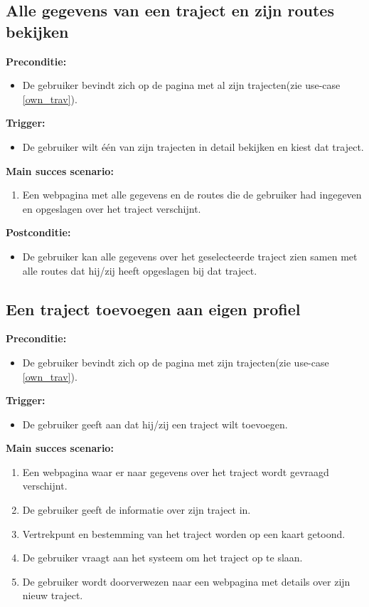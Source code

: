 \documentclass[11pt,twoside,a4paper]{article}
\newcommand{\subpunt}[1]{
	\noindent
	\textbf{\small{#1}}
}
\newenvironment{precond}{
	\subpunt{Preconditie:}
	\begin{itemize}[label={}]
}{
	\end{itemize}
}
\newenvironment{trigger}{
	\subpunt{Trigger:}
	\begin{itemize}[label={}]
}{
	\end{itemize}
}
\newenvironment{mainss}{
	\subpunt{Main succes scenario:}
	\begin{enumerate}
}{
	\end{enumerate}
}
\newenvironment{postcond}{
	\subpunt{Postconditie:}
	\begin{itemize}[label={}]
}{
	\end{itemize}
}
\begin{document}
	
	\subsection{Alle gegevens van een traject en zijn routes bekijken}\label{trav_detail}
	
	\begin{precond}
		\item De gebruiker bevindt zich op de pagina met al zijn trajecten(zie use-case \ref{own_trav}).
	\end{precond}
	
	\begin{trigger}
		\item De gebruiker wilt \'e\'en van zijn trajecten in detail bekijken en kiest dat traject.
	\end{trigger}
	
	\begin{mainss}
		\item Een webpagina met alle gegevens en de routes die de gebruiker had ingegeven en opgeslagen over het traject verschijnt.
	\end{mainss}
	
	\begin{postcond}
		\item De gebruiker kan alle gegevens over het geselecteerde traject zien samen met alle routes dat hij/zij heeft opgeslagen bij dat traject.
	\end{postcond}
	
	
	\subsection{Een traject toevoegen aan eigen profiel}
	
	\begin{precond}
		\item De gebruiker bevindt zich op de pagina met zijn trajecten(zie use-case \ref{own_trav}).
	\end{precond}
	
	\begin{trigger}
		\item De gebruiker geeft aan dat hij/zij een traject wilt toevoegen.
	\end{trigger}
	
	\begin{mainss}
		\item Een webpagina waar er naar gegevens over het traject wordt gevraagd verschijnt.\label{newtrav_beg}
		\item De gebruiker geeft de informatie over zijn traject in.\label{newtrav_inv}
		\item Vertrekpunt en bestemming van het traject worden op een kaart getoond.\label{newtrav_krt}
		\item De gebruiker vraagt aan het systeem om het traject op te slaan.\label{newtrav_save}
		\item De gebruiker wordt doorverwezen naar een webpagina met details over zijn nieuw traject.\label{newtrav_end}
	\end{mainss}	
	
\end{document}
